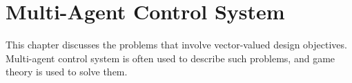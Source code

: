 \chapter{Multi-Agent Control System} \label{ch:macs}

This chapter discusses the problems that involve vector-valued design objectives. Multi-agent control system is often used to describe such problems, and game theory is used to solve them.